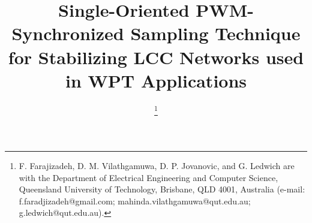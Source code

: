 \documentclass[journal,a4paper,10pt,twoside]{IEEEtran} %
\begin{document}
	
	\title{{\color{blue}Single-Oriented} PWM-Synchronized Sampling Technique for Stabilizing LCC Networks used in WPT Applications}
	
	\author{
        
		\thanks{
			F. Farajizadeh, D. M. Vilathgamuwa, D. P. Jovanovic, and G. Ledwich are with the Department of Electrical Engineering and Computer Science, Queensland University of Technology, Brisbane, QLD 4001, Australia (e-mail: f.faradjizadeh@gmail.com; mahinda.vilathgamuwa@qut.edu.au; g.ledwich@qut.edu.au).
		}
	}
	
	
	
	
	
	
	\maketitle %
	
\end{document}
